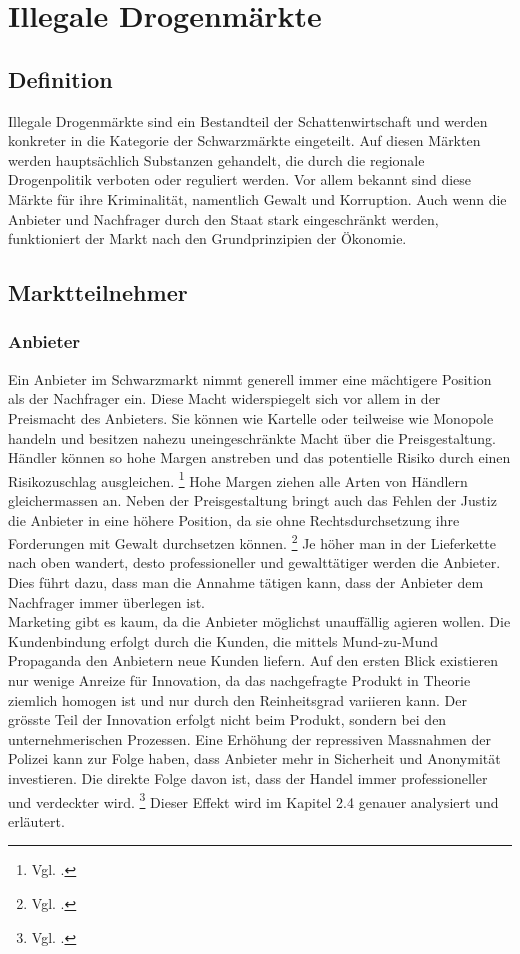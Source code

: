 \documentclass[../main.tex]{subfiles}
\begin{document}
 	\section{Illegale Drogenmärkte}
 	
 	\subsection{Definition}
 	
 	Illegale Drogenmärkte sind ein Bestandteil der Schattenwirtschaft und werden konkreter in die Kategorie der Schwarzmärkte eingeteilt.
 	Auf diesen Märkten werden hauptsächlich Substanzen gehandelt, die durch die regionale Drogenpolitik verboten oder reguliert werden.
 	Vor allem bekannt sind diese Märkte für ihre Kriminalität, namentlich Gewalt und Korruption.
 	Auch wenn die Anbieter und Nachfrager durch den Staat stark eingeschränkt werden, funktioniert der Markt nach den Grundprinzipien der Ökonomie.
 		
	
	\subsection{Marktteilnehmer}	
	
	\subsubsection{Anbieter}	
	Ein Anbieter im Schwarzmarkt nimmt generell immer eine mächtigere Position als der Nachfrager ein.
	Diese Macht widerspiegelt sich vor allem in der Preismacht des Anbieters.
	Sie können wie Kartelle oder teilweise wie Monopole handeln und besitzen nahezu uneingeschränkte Macht über die Preisgestaltung.
	Händler können so hohe Margen anstreben und das potentielle Risiko durch einen Risikozuschlag ausgleichen.%
	\footnote{Vgl. \cite{becker-2006}.}
	Hohe Margen ziehen alle Arten von Händlern gleichermassen an.
	Neben der Preisgestaltung bringt auch das Fehlen der Justiz die Anbieter in eine höhere Position, da sie ohne Rechtsdurchsetzung ihre Forderungen mit Gewalt durchsetzen können.%
	\footnote{Vgl. \cite{departmentofjustice-1994}.}
	Je höher man in der Lieferkette nach oben wandert, desto professioneller und gewalttätiger werden die Anbieter. 
	Dies führt dazu, dass man die Annahme tätigen kann, dass der Anbieter dem Nachfrager immer überlegen ist.\\
	
	\noindent
	Marketing gibt es kaum, da die Anbieter möglichst unauffällig agieren wollen.
	Die Kundenbindung erfolgt durch die Kunden, die mittels Mund-zu-Mund Propaganda den Anbietern neue Kunden liefern.
	Auf den ersten Blick existieren nur wenige Anreize für Innovation, da das nachgefragte Produkt in Theorie ziemlich homogen ist und nur durch den Reinheitsgrad variieren kann.		
	Der grösste Teil der Innovation erfolgt nicht beim Produkt, sondern bei den unternehmerischen Prozessen. 
	Eine Erhöhung der repressiven Massnahmen der Polizei kann zur Folge haben, dass Anbieter mehr in Sicherheit und Anonymität investieren.
	Die direkte Folge davon ist, dass der Handel immer professioneller und verdeckter wird.%
\footnote{Vgl. \cite{haucap-2018}.}
	Dieser Effekt wird im Kapitel 2.4 genauer analysiert und erläutert.
	
\end{document}
